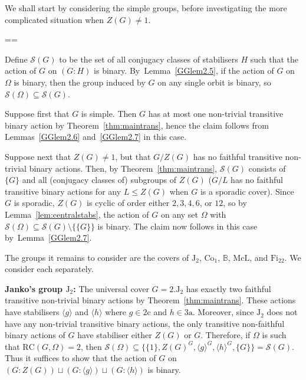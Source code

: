 \documentclass[11pt, a4paper]{amsart}
\makeatletter
\renewcommand{\proofname}{Proof}
\renewenvironment{proof}[1][\proofname]{\par
  \pushQED{\qed}  \normalfont \partopsep=\z@skip \topsep=\z@skip
  \trivlist
  \item[\hskip\labelsep
        \scshape
    #1\@addpunct{.}]\ignorespaces
}{  \popQED\endtrivlist\@endpefalse
}
\makeatother
\begin{document}
We shall start by considering the simple groups, before investigating the more complicated situation when $Z(G)\ne 1$.\vspace{12pt}
\begin{proof}[Proof of Theorem~\ref{thm:main}]
    Define $\mathcal{S}(G)$ to be the set of all conjugacy classes of stabilisers $H$ such that the action of $G$ on $(G:H)$ is binary. By~Lemma~\ref{GGlem2.5}, if the action of $G$ on $\Omega$ is binary, then the group induced by $G$ on any single orbit is binary, so $\mathcal{S}(\Omega)\subseteq\mathcal{S}(G)$.
    
    Suppose first that $G$ is simple. Then $G$ has at most one non-trivial transitive binary action by Theorem~\ref{thm:maintrans}, hence the claim follows from Lemmas~\ref{GGlem2.6} and~\ref{GGlem2.7} in this case.

    Suppose next that $Z(G)\ne 1$, but that $G/Z(G)$ has no faithful transitive non-trivial binary actions. Then, by Theorem~\ref{thm:maintrans}, $\mathcal{S}(G)$ consists of $\{G\}$ and all (conjugacy classes of) subgroups of $Z(G)$ ($G/L$ has no faithful transitive binary actions for any $L\leq Z(G)$ when $G$ is a sporadic cover). Since $G$ is sporadic, $Z(G)$ is cyclic of order either $2,3,4,6$, or $12$, so by Lemma~\ref{lem:centralstabs}, the action of $G$ on any set $\Omega$ with $\mathcal{S}(\Omega)\subseteq \mathcal{S}(G)\setminus\{\{G\}\}$ is binary. The claim now follows in this case by~Lemma~\ref{GGlem2.7}. 

    The groups it remains to consider are the covers of $\mathrm{J}_2$, $\mathrm{Co}_1$, $\mathbb{B}$, $\mathrm{McL}$, and $\mathrm{Fi}_{22}$. We consider each separately.

    \textbf{Janko's group $\mathrm{J}_2$:} The universal cover $G=2.\mathrm{J}_2$ has exactly two faithful transitive non-trivial binary actions by Theorem~\ref{thm:maintrans}. These actions have stabilisers $\langle g\rangle $ and $\langle h\rangle$ where $g\in\mathrm{2c}$ and $h\in \mathrm{3a}$. Moreover, since $\mathrm{J}_2$ does not have any non-trivial transitive binary actions, the only transitive non-faithful binary actions of $G$ have stabiliser either $Z(G)$ or $G$. Therefore, if $\Omega$ is such that $\mathrm{RC}(G,\Omega)=2$, then $\mathcal{S}(\Omega)\subseteq \{\{1\},Z(G)^G,\langle g\rangle^G,\langle h\rangle^G,\{G\}\}=\mathcal{S}(G)$. Thus it suffices to show that the action of $G$ on $(G:Z(G))\sqcup (G:\langle g\rangle)\sqcup (G:\langle h\rangle)$ is binary.


\end{proof}
\end{document}

